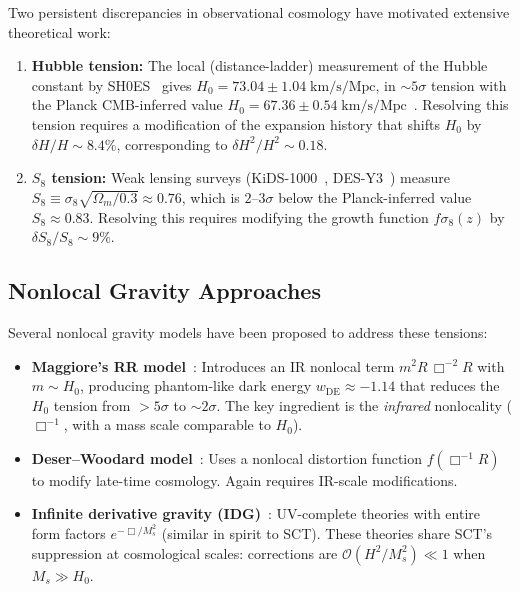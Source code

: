 \documentclass[11pt,a4paper]{article}
\theoremstyle{plain}
\theoremstyle{definition}
\begin{document}
Two persistent discrepancies in observational cosmology have motivated
extensive theoretical work:

\begin{enumerate}[nosep]
  \item \textbf{Hubble tension:} The local (distance-ladder) measurement
    of the Hubble constant by SH0ES~\cite{SH0ES22} gives
    $H_0 = 73.04 \pm 1.04\;\mathrm{km/s/Mpc}$, in
    ${\sim}5\sigma$ tension with the Planck CMB-inferred value
    $H_0 = 67.36 \pm 0.54\;\mathrm{km/s/Mpc}$~\cite{Planck18}.
    Resolving this tension requires a modification of the expansion
    history that shifts $H_0$ by $\delta H/H \sim 8.4\%$, corresponding
    to $\delta H^2/H^2 \sim 0.18$.

  \item \textbf{$S_8$ tension:} Weak lensing surveys
    (KiDS-1000~\cite{KiDS21}, DES-Y3~\cite{DES22}) measure
    $S_8 \equiv \sigma_8\sqrt{\Omega_m/0.3} \approx 0.76$, which is
    $2$--$3\sigma$ below the Planck-inferred value $S_8 \approx 0.83$.
    Resolving this requires modifying the growth function $f\sigma_8(z)$
    by $\delta S_8/S_8 \sim 9\%$.
\end{enumerate}

\subsection{Nonlocal Gravity Approaches}

Several nonlocal gravity models have been proposed to address these
tensions:

\begin{itemize}[nosep]
  \item \textbf{Maggiore's RR model}~\cite{Maggiore16}: Introduces an
    IR nonlocal term $m^2 R\,\Box^{-2} R$ with $m \sim H_0$, producing
    phantom-like dark energy $w_{\mathrm{DE}} \approx -1.14$ that
    reduces the $H_0$ tension from $>5\sigma$ to ${\sim}2\sigma$.
    The key ingredient is the \emph{infrared} nonlocality
    ($\Box^{-1}$, with a mass scale comparable to $H_0$).

  \item \textbf{Deser--Woodard model}~\cite{DW07}: Uses a nonlocal
    distortion function $f(\Box^{-1} R)$ to modify late-time cosmology.
    Again requires IR-scale modifications.

  \item \textbf{Infinite derivative gravity (IDG)}~\cite{BMS06,Mod12}:
    UV-complete theories with entire form factors
    $e^{-\Box/M_s^2}$ (similar in spirit to SCT). These theories share
    SCT's suppression at cosmological scales: corrections are
    $\mathcal{O}(H^2/M_s^2) \ll 1$ when $M_s \gg H_0$.
\end{itemize}
\end{document}

